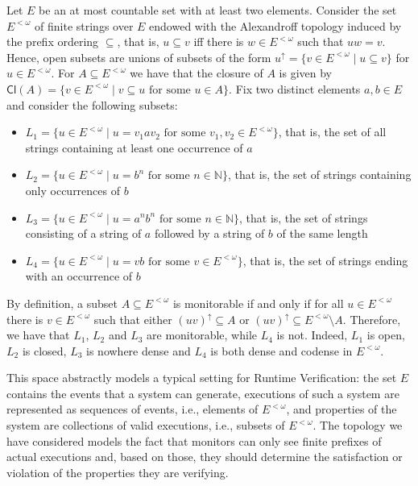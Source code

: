 \documentclass{lmcs}
\newcommand{\N}{\mathbb N}
\newcommand{\Cl}[1]{\mathsf{Cl}(#1)}
\begin{document}
\begin{exa} \label{ex:finstr} 
Let $E$ be an at most countable set with at least two elements. 
Consider the set $E^{{<}\omega}$ of finite strings over $E$ endowed with the Alexandroff topology induced by the prefix ordering $\subseteq $, that is, $u\subseteq v$ iff there is $w\in E^{{<}\omega}$ such that $uw = v$. 
Hence, open subsets are unions of subsets of the form 
$u^{\uparrow }= \{ v \in E^{{<}\omega}\mid u \subseteq v\}$ 
for $u \in E^{{<}\omega}$.
For $A\subseteq E^{{<}\omega}$ we have that the closure of $A$ is given by 
$\Cl{A} = \{ v\in E^{{<}\omega} \mid v\subseteq u \mbox{ for some } u \in A \}$.
% 
Fix two distinct elements $a,b\in E$ and consider the following subsets:
\begin{itemize}
\item $L_1 = \{ u \in E^{{<}\omega} \mid u = v_1 a v_2 \mbox{ for some } v_1,v_2\in E^{{<}\omega} \}$, that is, the set of all strings containing at least one occurrence of $a$
\item $L_2 = \{ u \in E^{{<}\omega} \mid u = b^n \mbox{ for some } n \in \N \}$, that is, the set of strings containing only occurrences of $b$ 
\item $L_3 = \{ u \in E^{{<}\omega} \mid u = a^n b^n \mbox{ for some } n \in \N \}$, that is,  the set of strings consisting of a string of $a$ followed by a string of $b$ of the same length
\item $L_4 = \{ u \in E^{{<}\omega} \mid u = vb \mbox{ for some } v \in E^{{<}\omega} \}$, that is, the set of strings ending with an occurrence of $b$
\end{itemize}
By definition, a subset $A\subseteq E^{{<}\omega}$ is monitorable if and only if 
for all $u \in E^{{<}\omega}$ there is $v\in E^{{<}\omega}$ such that 
either $(uv)^{\uparrow }\subseteq A$ or $(uv)^{\uparrow }\subseteq E^{{<}\omega}\setminus A$. 
%
Therefore, we have that $L_1$, $L_2$ and $L_3$ are monitorable, while $L_4$ is not. 
Indeed, $L_1$ is open, $L_2$ is closed, $L_3$ is nowhere dense and $L_4$ is both dense and codense in $E^{{<}\omega}$. 

This space abstractly models a typical setting for Runtime Verification: 
the set $E$  contains the events that a system can generate, 
executions of such a system are represented as sequences of events, i.e., elements of $E^{{<}\omega}$, and 
properties of the system are collections of valid executions, i.e., subsets of $E^{{<}\omega}$. 
The topology we have considered models the fact that 
monitors can only see finite prefixes of actual executions and, based on those, they should determine the satisfaction or violation of  the properties they are verifying. 
% 
\end{exa}
\end{document}
